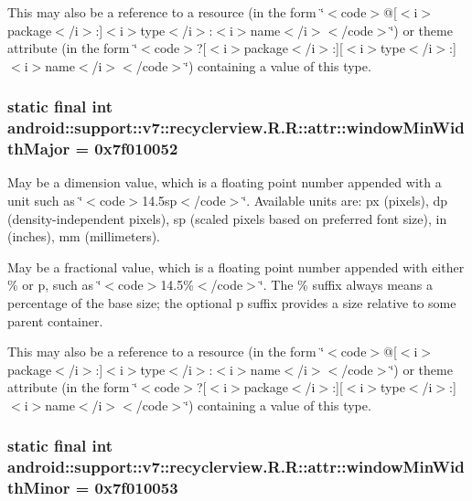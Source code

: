 This may also be a reference to a resource (in the form \char`\"{}$<$code$>$@\mbox{[}$<$i$>$package$<$/i$>$:\mbox{]}$<$i$>$type$<$/i$>$:$<$i$>$name$<$/i$>$$<$/code$>$\char`\"{}) or theme attribute (in the form \char`\"{}$<$code$>$?\mbox{[}$<$i$>$package$<$/i$>$:\mbox{]}\mbox{[}$<$i$>$type$<$/i$>$:\mbox{]}$<$i$>$name$<$/i$>$$<$/code$>$\char`\"{}) containing a value of this type. \hypertarget{classandroid_1_1support_1_1v7_1_1recyclerview_1_1_r_1_1attr_e2de3eb1ac20bc496dccdb0d1b7fdd50}{
\subsubsection[{windowMinWidthMajor}]{\setlength{\rightskip}{0pt plus 5cm}static final int android::support::v7::recyclerview.R.R::attr::windowMinWidthMajor = 0x7f010052}}
\label{classandroid_1_1support_1_1v7_1_1recyclerview_1_1_r_1_1attr_e2de3eb1ac20bc496dccdb0d1b7fdd50}


May be a dimension value, which is a floating point number appended with a unit such as \char`\"{}$<$code$>$14.5sp$<$/code$>$\char`\"{}. Available units are: px (pixels), dp (density-independent pixels), sp (scaled pixels based on preferred font size), in (inches), mm (millimeters). 

May be a fractional value, which is a floating point number appended with either \% or p, such as \char`\"{}$<$code$>$14.5\%$<$/code$>$\char`\"{}. The \% suffix always means a percentage of the base size; the optional p suffix provides a size relative to some parent container. 

This may also be a reference to a resource (in the form \char`\"{}$<$code$>$@\mbox{[}$<$i$>$package$<$/i$>$:\mbox{]}$<$i$>$type$<$/i$>$:$<$i$>$name$<$/i$>$$<$/code$>$\char`\"{}) or theme attribute (in the form \char`\"{}$<$code$>$?\mbox{[}$<$i$>$package$<$/i$>$:\mbox{]}\mbox{[}$<$i$>$type$<$/i$>$:\mbox{]}$<$i$>$name$<$/i$>$$<$/code$>$\char`\"{}) containing a value of this type. \hypertarget{classandroid_1_1support_1_1v7_1_1recyclerview_1_1_r_1_1attr_d7224824eab56b433ba0cc55537fabf0}{
\subsubsection[{windowMinWidthMinor}]{\setlength{\rightskip}{0pt plus 5cm}static final int android::support::v7::recyclerview.R.R::attr::windowMinWidthMinor = 0x7f010053}}
\label{classandroid_1_1support_1_1v7_1_1recyclerview_1_1_r_1_1attr_d7224824eab56b433ba0cc55537fabf0}


